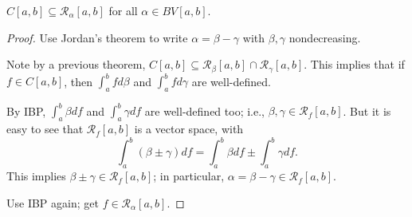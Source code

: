 \documentclass[letterpaper, reqno,11pt]{article}
\begin{document}
\begin{cor}
  \normalfont $C[a, b] \subseteq \mathcal R_\alpha[a, b]$ for all $\alpha \in BV[a, b]$.
\end{cor}

\begin{proof}
  Use Jordan's theorem to write $\alpha = \beta - \gamma$ with $\beta, \gamma$ nondecreasing.

  Note by a previous theorem, $C[a, b] \subseteq \mathcal R_\beta[a, b] \cap \mathcal R_\gamma[a, b]$. This implies that if $f \in C[a, b]$, then $\int_a^b fd\beta$ and $\int_a^b fd\gamma$ are well-defined.

  By IBP, $\int_a^b \beta df$ and $\int_a^b \gamma df$ are well-defined too; i.e., $\beta, \gamma \in \mathcal R_f[a, b]$. But it is easy to see that $\mathcal R_f[a, b]$ is a vector space, with
  $$ \int_a^b (\beta \pm \gamma) df = \int_a^b \beta df \pm \int_a^b \gamma df. $$
  This implies $\beta \pm \gamma \in \mathcal R_f[a,b]$; in particular, $\alpha = \beta - \gamma \in  \mathcal R_f[a, b]$.

  Use IBP again; get $f \in \mathcal R_\alpha[a, b]$.
\end{proof}
\end{document}
